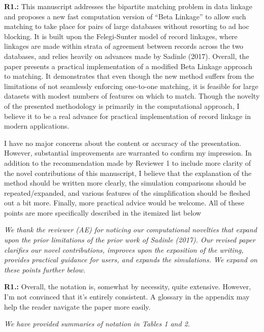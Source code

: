 \documentclass[letterpaper, parskip]{scrartcl}
\newcommand{\pointRaised}[2]{%
	\textbf{#1.\theresponsectr:} #2
}
\newcounter{responsectr}[section]     %
\newcommand{\reply}[1]{%
	\refstepcounter{responsectr}%
		\begin{tcolorbox}
			\itshape #1
		\end{tcolorbox}
}
\begin{document}


	\setcounter{responsectr}{0}

	\pointRaised{R1}{%
	This manuscript addresses the bipartite matching problem in data linkage and proposes a new fast computation version of “Beta Linkage” to allow such matching to take place for pairs of large databases without resorting to ad hoc blocking. It is built upon the Felegi-Sunter model of record linkages, where linkages are made within strata of agreement between records across the two databases, and relies heavily on advances made by Sadinle (2017). Overall, the paper presents a practical implementation of a modified Beta Linkage approach to	matching. It demonstrates that even though the new method suffers from the limitations of not seamlessly enforcing one-to-one matching, it is feasible for large datasets with modest numbers of features on which to match. Though the novelty of the presented methodology is primarily in the computational approach, I believe it to be a real advance for practical implementation of record linkage in modern applications.
	
	I have no major concerns about the content or accuracy of the presentation. However, substantial improvements are warranted to confirm my impression. In addition to the recommendation made by Reviewer 1 to include more clarity of the novel contributions of this manuscript, I believe that the explanation of the method should be written more clearly, the simulation comparisons should be repeated/expanded, and various features of the simplification should be fleshed out a bit more. Finally, more practical advice would be welcome. All of these points are more specifically described in the itemized list below
	}

	\reply{%
	We thank the reviewer (AE) for noticing our computational novelties that expand upon the prior limitations of the prior work of Sadinle (2017). Our revised paper clarifies our novel contributions, improves upon the exposition of the writing, provides practical guidance for users, and expands the simulations. We expand on these points further below.
	}

	\pointRaised{R1}{%
		Overall, the notation is, somewhat by necessity, quite extensive. However, I’m not convinced that it’s entirely consistent. A glossary in the appendix may help the reader navigate the paper more easily.}
\reply{%
	We have provided summaries of notation in Tables 1 and 2.
	
}
\end{document}
